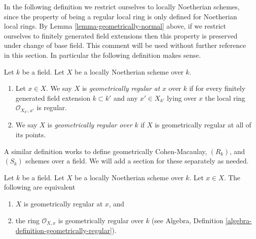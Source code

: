 \medskip\noindent
In the following definition we restrict ourselves to locally Noetherian
schemes, since the property of being a regular local ring is only
defined for Noetherian local rings. By Lemma \ref{lemma-geometrically-normal}
above, if we restrict ourselves to finitely generated field extensions then
this property is preserved under change of base field. This comment will be
used without further reference in this section. In particular the following
definition makes sense.

\begin{definition}
\label{definition-geometrically-regular}
Let $k$ be a field. Let $X$ be a locally Noetherian scheme over $k$.
\begin{enumerate}
\item Let $x \in X$. We say $X$ is {\it geometrically regular at $x$}
over $k$ if for every finitely generated field extension $k \subset k'$
and any $x' \in X_{k'}$ lying over $x$ the local ring
$\mathcal{O}_{X_{k'}, x'}$ is regular.
\item We say $X$ is {\it geometrically regular over $k$} if
$X$ is geometrically regular at all of its points.
\end{enumerate}
\end{definition}

\noindent
A similar definition works to define geometrically
Cohen-Macaulay, $(R_k)$, and $(S_k)$ schemes over a field.
We will add a section for these separately as needed.

\begin{lemma}
\label{lemma-geometrically-regular-at-point}
Let $k$ be a field.
Let $X$ be a locally Noetherian scheme over $k$.
Let $x \in X$.
The following are equivalent
\begin{enumerate}
\item $X$ is geometrically regular at $x$, and
\item the ring $\mathcal{O}_{X, x}$ is geometrically
regular over $k$ (see
Algebra, Definition \ref{algebra-definition-geometrically-regular}).
\end{enumerate}
\end{lemma}


